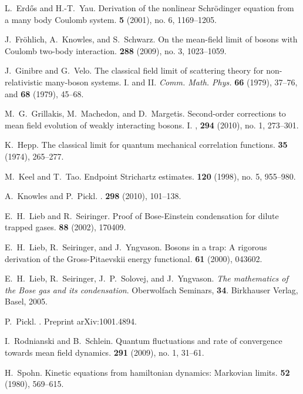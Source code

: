 \documentclass[11pt,a4paper]{article}
\begin{document}
\begin{thebibliography}{10}
L.~Erd{\H{o}}s and H.-T.~Yau.
\newblock Derivation of the nonlinear {S}chr\"odinger equation from a many body
  {C}oulomb system.
 {\bf 5} (2001), no. 6, 1169--1205.

J.~Fr{\"o}hlich, A.~Knowles, and S.~Schwarz.
\newblock On the mean-field limit of bosons with {C}oulomb two-body
  interaction.
 {\bf 288} (2009), no. 3, 1023--1059.

J.~Ginibre and G.~Velo.
\newblock The classical field limit of scattering theory for non-relativistic
  many-boson systems. I. and II. \textit{Comm. Math. Phys.} \textbf{66} (1979),
37--76, and \textbf{68} (1979), 45--68.

M.~G.~Grillakis, M.~Machedon, and D.~Margetis.
\newblock Second-order corrections to mean field evolution of weakly
  interacting bosons. {I}.
, {\bf 294} (2010), no. 1, 273--301.

K.~Hepp.
\newblock The classical limit for quantum mechanical correlation functions.
 {\bf 35} (1974), 265--277.

M.~Keel and T.~Tao.
\newblock Endpoint {S}trichartz estimates.
 {\bf 120} (1998), no. 5, 955--980.

A.~{Knowles} and P.~{Pickl}.
.
 {\bf 298} (2010), 101--138.

E.~H.~Lieb and R.~Seiringer.
\newblock Proof of {B}ose-{E}instein condensation for dilute trapped gases.
 {\bf 88} (2002), 170409.

E.~H.~Lieb, R.~Seiringer, and J.~Yngvason.
\newblock Bosons in a trap: A rigorous derivation of the {G}ross-{P}itaevskii
  energy functional.  {\bf 61} (2000), 043602.

E.~H.~Lieb, R.~Seiringer, J.~P.~Solovej, and J.~Yngvason.
{\it The mathematics of the {B}ose gas and its condensation}. 
Oberwolfach Seminars, {\bf 34}. Birkhauser Verlag, Basel, 2005.

%
P.~{Pickl}.
. Preprint arXiv:1001.4894.

I.~Rodnianski and B.~Schlein.
\newblock Quantum fluctuations and rate of convergence towards mean field
  dynamics.  {\bf 291} (2009), no. 1, 31--61.

H.~Spohn.
\newblock Kinetic equations from hamiltonian dynamics: Markovian limits.
 {\bf 52} (1980), 569--615.

\end{thebibliography}
\end{document}
